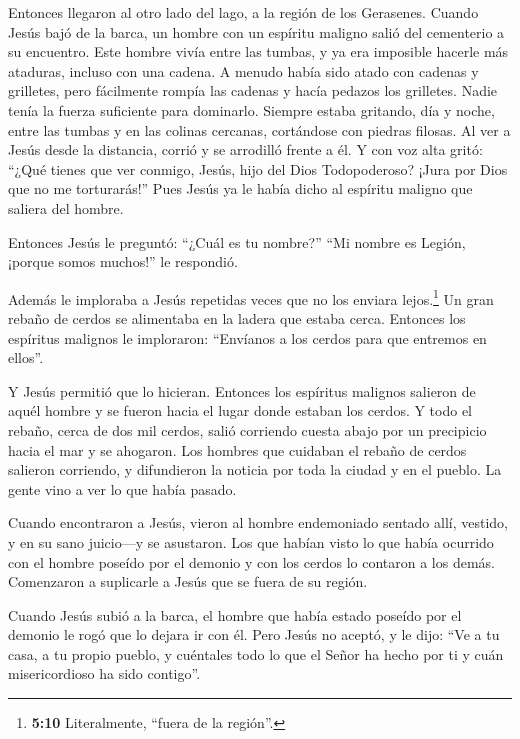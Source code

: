  Entonces llegaron al otro lado del lago, a la región de
los Gerasenes.  Cuando Jesús bajó de la barca, un hombre
con un espíritu maligno salió del cementerio a su encuentro.
 Este hombre vivía entre las tumbas, y ya era imposible
hacerle más ataduras, incluso con una cadena.  A menudo
había sido atado con cadenas y grilletes, pero fácilmente rompía las
cadenas y hacía pedazos los grilletes. Nadie tenía la fuerza suficiente
para dominarlo.  Siempre estaba gritando, día y noche,
entre las tumbas y en las colinas cercanas, cortándose con piedras
filosas.  Al ver a Jesús desde la distancia, corrió y se
arrodilló frente a él.  Y con voz alta gritó: ``¿Qué
tienes que ver conmigo, Jesús, hijo del Dios Todopoderoso? ¡Jura por
Dios que no me torturarás!''  Pues Jesús ya le había dicho
al espíritu maligno que saliera del hombre.

 Entonces Jesús le preguntó: ``¿Cuál es tu nombre?'' ``Mi
nombre es Legión, ¡porque somos muchos!'' le respondió.

 Además le imploraba a Jesús repetidas veces que no los
enviara lejos.\footnote{\textbf{5:10} Literalmente, ``fuera de la
  región''.}  Un gran rebaño de cerdos se alimentaba en
la ladera que estaba cerca.  Entonces los espíritus
malignos le imploraron: ``Envíanos a los cerdos para que entremos en
ellos''.

 Y Jesús permitió que lo hicieran. Entonces los espíritus
malignos salieron de aquél hombre y se fueron hacia el lugar donde
estaban los cerdos. Y todo el rebaño, cerca de dos mil cerdos, salió
corriendo cuesta abajo por un precipicio hacia el mar y se ahogaron.
 Los hombres que cuidaban el rebaño de cerdos salieron
corriendo, y difundieron la noticia por toda la ciudad y en el pueblo.
La gente vino a ver lo que había pasado.

 Cuando encontraron a Jesús, vieron al hombre endemoniado
sentado allí, vestido, y en su sano juicio---y se asustaron.
 Los que habían visto lo que había ocurrido con el hombre
poseído por el demonio y con los cerdos lo contaron a los demás.
 Comenzaron a suplicarle a Jesús que se fuera de su
región.

 Cuando Jesús subió a la barca, el hombre que había
estado poseído por el demonio le rogó que lo dejara ir con él.
 Pero Jesús no aceptó, y le dijo: ``Ve a tu casa, a tu
propio pueblo, y cuéntales todo lo que el Señor ha hecho por ti y cuán
misericordioso ha sido contigo''.


